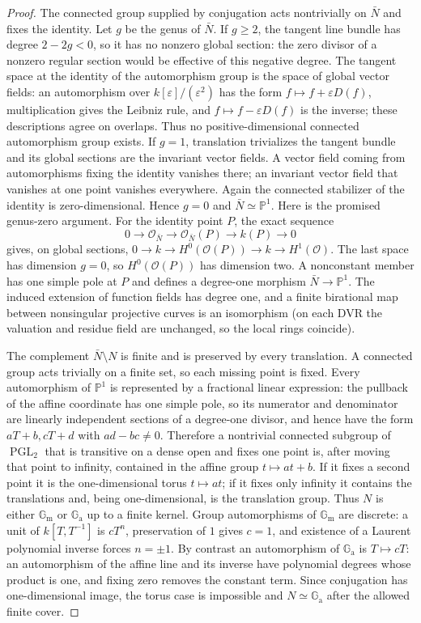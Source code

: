 \documentclass[11pt,oneside]{article}
\theoremstyle{definition}
\theoremstyle{remark}
\newcommand{\Ga}{\mathbb G_{\mathrm a}}
\newcommand{\Gm}{\mathbb G_{\mathrm m}}
\begin{document}
\begin{proof}
The connected group supplied by conjugation acts nontrivially on $\bar N$ and fixes the
identity.  Let $g$ be the genus of $\bar N$.  If $g\geq2$, the tangent line bundle has
degree $2-2g<0$, so it has no nonzero global section: the zero divisor of a nonzero
regular section would be effective of this negative degree.  The tangent space at the
identity of the automorphism group is the space of global vector fields: an automorphism
over $k[\varepsilon]/(\varepsilon^2)$ has the form
$f\mapsto f+\varepsilon D(f)$, multiplication gives the Leibniz rule, and
$f\mapsto f-\varepsilon D(f)$ is the inverse; these descriptions agree on overlaps.
Thus no positive-dimensional connected automorphism group exists.  If $g=1$, translation
trivializes the tangent bundle and its global sections are the invariant vector fields.
A vector field coming from automorphisms fixing the identity vanishes there; an invariant
vector field that vanishes at one point vanishes everywhere.  Again the connected
stabilizer of the identity is zero-dimensional.  Hence $g=0$ and
$\bar N\simeq\mathbb P^1$.  Here is the promised genus-zero argument.  For the identity
point $P$, the exact sequence
\[
 0\longrightarrow\mathcal O_{\bar N}\longrightarrow
 \mathcal O_{\bar N}(P)\longrightarrow k(P)\longrightarrow0
\]
gives, on global sections,
$0\to k\to H^0(\mathcal O(P))\to k\to H^1(\mathcal O)$.  The last space has
dimension $g=0$, so $H^0(\mathcal O(P))$ has dimension two.  A nonconstant member has
one simple pole at $P$ and defines a degree-one morphism $\bar N\to\mathbb P^1$.
The induced extension of function fields has degree one, and a finite birational map
between nonsingular projective curves is an isomorphism (on each DVR the valuation and
residue field are unchanged, so the local rings coincide).

The complement $\bar N\setminus N$ is finite and is preserved by every translation.
A connected group acts trivially on a finite set, so each missing point is fixed.  Every
automorphism of $\mathbb P^1$ is represented by a fractional linear expression: the
pullback of the affine coordinate has one simple pole, so its numerator and denominator
are linearly independent sections of a degree-one divisor, and hence have the form
$aT+b,cT+d$ with $ad-bc\neq0$.  Therefore a
nontrivial connected subgroup of $\operatorname{PGL}_2$ that is transitive on a dense
open and fixes one point is, after moving that point to infinity, contained in the affine
group $t\mapsto at+b$.  If it fixes a second point it is the one-dimensional torus
$t\mapsto at$; if it fixes only infinity it contains the translations and, being
one-dimensional, is the translation group.  Thus $N$ is either $\Gm$ or $\Ga$ up to a
finite kernel.  Group automorphisms of $\Gm$ are discrete: a unit of
$k[T,T^{-1}]$ is $cT^n$, preservation of $1$ gives $c=1$, and existence of a Laurent
polynomial inverse forces $n=\pm1$.  By contrast an automorphism of $\Ga$ is
$T\mapsto cT$: an automorphism of the affine line and its inverse have polynomial degrees
whose product is one, and fixing zero removes the constant term.  Since conjugation has
one-dimensional image, the torus case is impossible and $N\simeq\Ga$ after the allowed
finite cover.


\end{proof}
\end{document}

